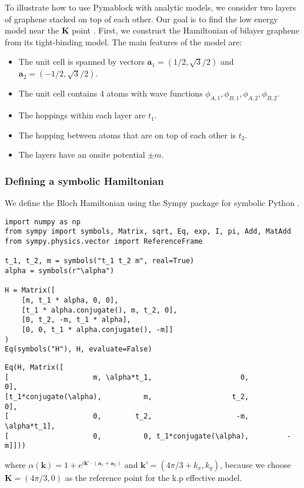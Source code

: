 
To illustrate how to use Pymablock with analytic models, we consider two layers
of graphene stacked on top of each other.
Our goal is to find the low energy model near the $\mathbf{K}$ point
\cite{McCann_2013}.
First, we construct the Hamiltonian of bilayer graphene from its tight-binding
model.
%
%
The main features of the model are:
%
\begin{itemize}
\item The unit cell is spanned by vectors $\mathbf{a}_1 = (1/2, \sqrt{3}/2)$ and $\mathbf{a}_2=( -1/2, \sqrt{3}/2)$.
\item The unit cell contains 4 atoms with wave functions $\phi_{A,1}, \phi_{B,1}, \phi_{A,2}, \phi_{B,2}$.
\item The hoppings within each layer are $t_1$.
\item The hopping between atoms that are on top of each other is $t_2$.
\item The layers have an onsite potential $\pm m$.
\end{itemize}

\subsubsection{Defining a symbolic Hamiltonian}

We define the Bloch Hamiltonian using the Sympy package for symbolic Python
\cite{Meurer_2017}.
%
\begin{verbatim}
import numpy as np
from sympy import symbols, Matrix, sqrt, Eq, exp, I, pi, Add, MatAdd
from sympy.physics.vector import ReferenceFrame

t_1, t_2, m = symbols("t_1 t_2 m", real=True)
alpha = symbols(r"\alpha")

H = Matrix([
    [m, t_1 * alpha, 0, 0],
    [t_1 * alpha.conjugate(), m, t_2, 0],
    [0, t_2, -m, t_1 * alpha],
    [0, 0, t_1 * alpha.conjugate(), -m]]
)
Eq(symbols("H"), H, evaluate=False)
\end{verbatim}

\begin{verbatim}
Eq(H, Matrix([
[                    m, \alpha*t_1,                     0,          0],
[t_1*conjugate(\alpha),          m,                   t_2,          0],
[                    0,        t_2,                    -m, \alpha*t_1],
[                    0,          0, t_1*conjugate(\alpha),         -m]]))
\end{verbatim}
%
where $\alpha(\mathbf{k}) = 1 + e^{i \mathbf{k'} \cdot (\mathbf{a}_1 +
\mathbf{a}_2)}$ and $\mathbf{k'} = (4\pi/3 + k_x, k_y)$, because we choose
$\mathbf{K}=(4\pi/3, 0)$ as the reference point for the k.p effective model.

